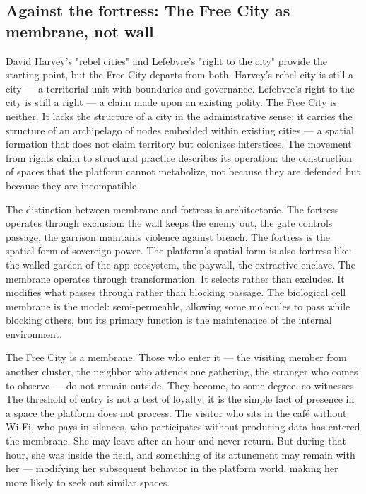 \subsection{Against the fortress: The Free City as membrane, not wall}

David Harvey's "rebel cities" and Lefebvre's "right to the city" provide the starting point, but the Free City departs from both. Harvey's rebel city is still a city — a territorial unit with boundaries and governance. Lefebvre's right to the city is still a right — a claim made upon an existing polity. The Free City is neither. It lacks the structure of a city in the administrative sense; it carries the structure of an archipelago of nodes embedded within existing cities — a spatial formation that does not claim territory but colonizes interstices. The movement from rights claim to structural practice describes its operation: the construction of spaces that the platform cannot metabolize, not because they are defended but because they are incompatible.

The distinction between membrane and fortress is architectonic. The fortress operates through exclusion: the wall keeps the enemy out, the gate controls passage, the garrison maintains violence against breach. The fortress is the spatial form of sovereign power. The platform's spatial form is also fortress-like: the walled garden of the app ecosystem, the paywall, the extractive enclave. The membrane operates through transformation. It selects rather than excludes. It modifies what passes through rather than blocking passage. The biological cell membrane is the model: semi-permeable, allowing some molecules to pass while blocking others, but its primary function is the maintenance of the internal environment.

The Free City is a membrane. Those who enter it — the visiting member from another cluster, the neighbor who attends one gathering, the stranger who comes to observe — do not remain outside. They become, to some degree, co-witnesses. The threshold of entry is not a test of loyalty; it is the simple fact of presence in a space the platform does not process. The visitor who sits in the café without Wi-Fi, who pays in silences, who participates without producing data has entered the membrane. She may leave after an hour and never return. But during that hour, she was inside the field, and something of its attunement may remain with her — modifying her subsequent behavior in the platform world, making her more likely to seek out similar spaces.

